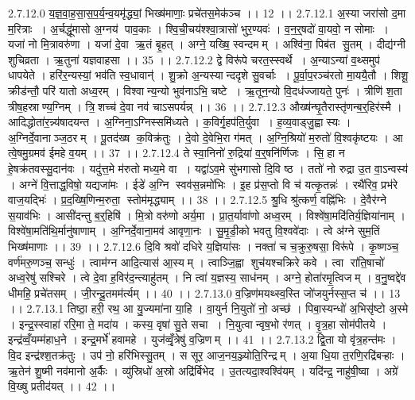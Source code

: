2.7.12.0
य॒ज्ञ॒वा॒ह॒सा॒स॒प॒र्य॒न्व॒यमृ॑द्ध्यां॒ भिख्ष॑माणाः॒ प्रचे॑तस॒मेक॑ञ्च ।। 12 ।।
2.7.12.1
अ॒स्या जरा॑सो द॒मा म॒रित्राः । अ॒र्चद्धू॑मासो अ॒ग्नय॑ पाव॒काः । श्वि॒ची॒चय॑श्श्वा॒त्रासो॑ भुर॒ण्यवः॑ । व॒न॒र्॒षदो॑ वा॒यवो॒ न सोमाः । यजा॑ नो मि॒त्रावरु॑णा । यजा॑ दे॒वा ऋ॒तं बृ॒हत् । अग्ने॒ यख्षि॒ स्वन्दमम् । अश्वि॑ना॒ पिब॑त सु॒तम् । दीद्य॑ग्नी शुचिव्रता । ऋ॒तुना॑ यज्ञवाहसा ।। 35 ।।
2.7.12.2
द्वे विरू॑पे चरत॒स्स्वर्थे । अ॒न्याऽन्या॑ व॒थ्समुप॑ धापयेते । हरि॑र॒न्यस्यां॒ भव॑ति स्व॒धावान्॑ । शु॒क्रो अ॒न्यस्यान्ददृशे सु॒वर्चाः । पू॒र्वा॒प॒रञ्च॑रतो मा॒ययै॒तौ । शिशू॒ क्रीड॑न्तौ॒ परि॑ यातो अध्व॒रम् । विश्वान्य॒न्यो भुव॑नाऽभि॒ चष्टे । ऋ॒तून॒न्यो वि॒दध॑ज्जायते॒ पुनः॑ । त्रीणि॑ श॒ता त्रीष॒हस्राण्य॒ग्निम् । त्रि॒॒शच्च॑ दे॒वा नव॑ चाऽसपर्यन्न् ।। 36 ।।
2.7.12.3
औख्ष॑न्घृ॒तैरास्तृ॑णन्ब॒र्॒हिर॑स्मै । आदिद्धोता॑र॒न्न्य॑षादयन्त । अ॒ग्निना॒ऽग्निस्समि॑ध्यते । क॒विर्गृ॒हप॑ति॒र्युवा । ह॒व्य॒वाड्जु॒ह्वास्यः । अ॒ग्निर्दे॒वानाञ्ज॒ठरम् । पू॒तद॑ख्ष क॒विक्र॑तुः । दे॒वो दे॒वेभि॒रा ग॑मत् । अ॒ग्नि॒श्रियो॑ म॒रुतो॑ वि॒श्वकृ॑ष्टयः । आ त्वे॒षमु॒ग्रमव॑ ईमहे व॒यम् ।। 37 ।।
2.7.12.4
ते स्वा॒निनो॑ रु॒द्रिया॑ व॒र्॒षनि॑र्णिजः । सि॒॒हा न हे॒षक्र॑तवस्सु॒दान॑वः । यदु॑त्त॒मे म॑रुतो मध्य॒मे वा । यद्वा॑ऽव॒मे सु॑भगासो दि॒वि ष्ठ । ततो॑ नो रुद्रा उ॒त वा॒ऽन्वस्य॑ । अग्ने॑ वि॒त्ताद्ध॒विषो॒ यद्यजा॑मः । ईडे॑ अ॒ग्नि स्वव॑स॒न्नमो॑भिः । इ॒ह प्र॑स॒प्तो वि च॑ यत्कृ॒तन्नः॑ । रथै॑रिव॒ प्रभ॑रे वाज॒यद्भिः॑ । प्र॒द॒ख्षि॒णिन्म॒रुता॒॒ स्तोम॑मृद्ध्याम् ।। 38 ।।
2.7.12.5
श्रु॒धि श्रु॑त्कर्ण॒ वह्नि॑भिः । दे॒वैर॑ग्ने स॒याव॑भिः । आसी॑दन्तु ब॒र्॒हिषि॑ । मि॒त्रो वरु॑णो अर्य॒मा । प्रा॒त॒र्यावा॑णो अध्व॒रम् । विश्वे॑षा॒मदि॑तिर्य॒ज्ञिया॑नाम् । विश्वे॑षा॒मति॑थि॒र्मानु॑षाणाम् । अ॒ग्निर्दे॒वाना॒मव॑ आवृणा॒नः । सु॒मृ॒डी॒को भवतु वि॒श्ववे॑दाः । त्वे अ॑ग्ने सुम॒तिं भिख्ष॑माणाः ।। 39 ।।
2.7.12.6
दि॒वि श्रवो॑ दधिरे य॒ज्ञिया॑सः । नक्ता॑ च च॒क्रुरु॒षसा॒ विरू॑पे । कृ॒ष्णञ्च॒ वर्ण॑मरु॒णञ्च॒ सन्धुः॑ । त्वाम॑ग्न आदि॒त्यास॑ आ॒स्यम् । त्वाञ्जि॒ह्वा शुच॑यश्चक्रिरे कवे । त्वा रा॑ति॒षाचो॑ अध्व॒रेषु॑ सश्चिरे । त्वे दे॒वा ह॒विर॑द॒न्त्याहु॑तम् । नि त्वा॑ य॒ज्ञस्य॒ साध॑नम् । अग्ने॒ होता॑रमृ॒त्विजम् । व॒नु॒ष्वद्दे॑व धीमहि॒ प्रचे॑तसम् । जी॒रन्दू॒तमम॑र्त्यम् ।। 40 ।।
2.7.13.0
व॒ज्रिण॑मयथ्स्व॒स्ति जो॑जयुर्नस्स॒प्त च॑ ।। 13 ।।
2.7.13.1
तिष्ठा॒ हरी॒ रथ॒ आ यु॒ज्यमा॑ना या॒हि । वा॒युर्न नि॒युतो॑ नो॒ अच्छ॑ । पिबा॒स्यन्धो॑ अ॒भिसृ॑ष्टो अ॒स्मे । इन्द्र॒स्स्वाहा॑ ररि॒मा ते॒ मदा॑य । कस्य॒ वृषा॑ सु॒ते सचा । नि॒युत्वान्वृष॒भो र॑णत् । वृ॒त्र॒हा सोम॑पीतये । इन्द्र॑व्वँ॒यम्म॑हाध॒ने । इन्द्र॒मर्भे॑ हवामहे । युज॑व्वृँ॒त्रेषु॑ व॒ज्रिणम् ।। 41 ।।
2.7.13.2
द्वि॒ता यो वृ॑त्र॒हन्त॑मः । वि॒द इन्द्र॑श्श॒तक्र॑तुः । उप॑ नो॒ हरि॑भिस्सु॒तम् । स सूर॒ आज॒नय॒ञ्ज्योति॒रिन्द्रम् । अ॒या धि॒या त॒रणि॒रद्रि॑बऱ्हाः । ऋ॒तेन॑ शु॒ष्मी नव॑मानो अ॒र्कैः । व्यु॑स्रिधो॑ अ॒स्रो अद्रि॑र्बिभेद । उ॒तत्यदा॒श्वश्वि॑यम् । यदि॑न्द्र॒ नाहु॑षी॒ष्वा । अग्रे॑ वि॒ख्षु प्रतीद॑यत् ।। 42 ।।
